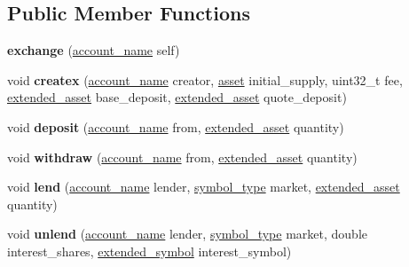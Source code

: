 \subsection*{Public Member Functions}
\begin{DoxyCompactItemize}
\item 
\mbox{\label{classaacio_1_1exchange_a1b32d97f61297d6b7158e9d7d7223928}} 
{\bfseries exchange} (\mbox{\hyperlink{structaacio_1_1chain_1_1name}{account\+\_\+name}} self)
\item 
\mbox{\label{classaacio_1_1exchange_a2e10a3d7e1b128f4761a756084e2a95a}} 
void {\bfseries createx} (\mbox{\hyperlink{structaacio_1_1chain_1_1name}{account\+\_\+name}} creator, \mbox{\hyperlink{structaacio_1_1asset}{asset}} initial\+\_\+supply, uint32\+\_\+t fee, \mbox{\hyperlink{structaacio_1_1extended__asset}{extended\+\_\+asset}} base\+\_\+deposit, \mbox{\hyperlink{structaacio_1_1extended__asset}{extended\+\_\+asset}} quote\+\_\+deposit)
\item 
\mbox{\label{classaacio_1_1exchange_aeab7e2fb40b5038b6233a3116765199c}} 
void {\bfseries deposit} (\mbox{\hyperlink{structaacio_1_1chain_1_1name}{account\+\_\+name}} from, \mbox{\hyperlink{structaacio_1_1extended__asset}{extended\+\_\+asset}} quantity)
\item 
\mbox{\label{classaacio_1_1exchange_ad3379e925b8a0d7140a3073484925c06}} 
void {\bfseries withdraw} (\mbox{\hyperlink{structaacio_1_1chain_1_1name}{account\+\_\+name}} from, \mbox{\hyperlink{structaacio_1_1extended__asset}{extended\+\_\+asset}} quantity)
\item 
\mbox{\label{classaacio_1_1exchange_ab76b632bb43f5135773ee3fcd0724afb}} 
void {\bfseries lend} (\mbox{\hyperlink{structaacio_1_1chain_1_1name}{account\+\_\+name}} lender, \mbox{\hyperlink{structaacio_1_1symbol__type}{symbol\+\_\+type}} market, \mbox{\hyperlink{structaacio_1_1extended__asset}{extended\+\_\+asset}} quantity)
\item 
\mbox{\label{classaacio_1_1exchange_a6dbd76c9e1a5d5de7ec7b461592d72aa}} 
void {\bfseries unlend} (\mbox{\hyperlink{structaacio_1_1chain_1_1name}{account\+\_\+name}} lender, \mbox{\hyperlink{structaacio_1_1symbol__type}{symbol\+\_\+type}} market, double interest\+\_\+shares, \mbox{\hyperlink{structaacio_1_1extended__symbol}{extended\+\_\+symbol}} interest\+\_\+symbol)

\end{DoxyCompactItemize}
